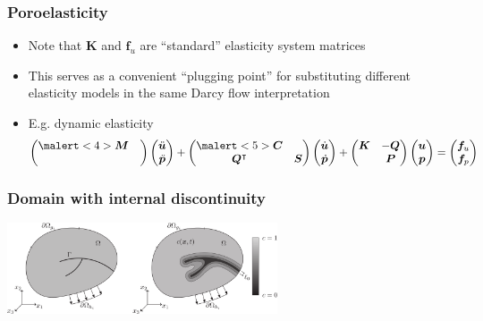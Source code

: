 \documentclass{beamer}
\begin{document}
\begin{frame}
  \frametitle{Poroelasticity}

  \begin{itemize}
  \item Note that $\bm K$ and $\bm f_u$ are ``standard'' elasticity
    system matrices
  \item<2-> This serves as a convenient ``plugging point'' for
    substituting different elasticity models in the same Darcy flow
    interpretation
  \item<3-> E.g. dynamic elasticity
    \[
      \begin{pmatrix} \malert<4>{\bm M} & \\ & \end{pmatrix}
      \begin{pmatrix} \ddot{\bm u} \\ \ddot{\bm p} \end{pmatrix} +
      \begin{pmatrix} \malert<5>{\bm C} & \\ \bm Q^\intercal & \bm S \end{pmatrix}
      \begin{pmatrix} \dot{\bm u} \\ \dot{\bm p} \end{pmatrix} +
      \begin{pmatrix} \bm K & - \bm Q \\ & \bm P \end{pmatrix}
      \begin{pmatrix} \bm u \\ \bm p \end{pmatrix} =
      \begin{pmatrix} \bm f_u \\ \bm f_p \end{pmatrix}
    \]
  \end{itemize}

  \begin{overlayarea}{\textwidth}{1cm}
    \begin{center}
    \end{center}
  \end{overlayarea}
\end{frame}

\begin{frame}
 \frametitle{Domain with internal discontinuity}

 \begin{center}
   \includegraphics[trim=0cm 0cm 20cm 0cm, clip=true, width=0.6\textwidth]{figs/crack}
 \end{center}
\end{frame}
\end{document}
